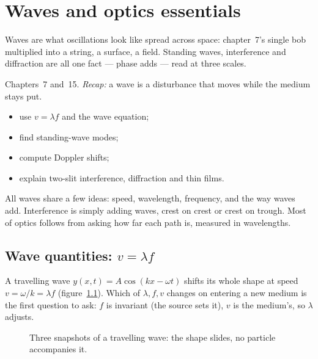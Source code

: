 \chapter{Waves and optics essentials}\label{ch:waves}

Waves are what oscillations look like spread across space: chapter~7's
single bob multiplied into a string, a surface, a field. Standing waves,
interference and diffraction are all one fact --- phase adds --- read at
three scales.

\begin{rulebox}
Chapters~7 and~15. \emph{Recap:} a wave is a disturbance that moves while the medium stays put.
\end{rulebox}
\begin{wins}
\begin{itemize}
\item use $v=\lambda f$ and the wave equation;
\item find standing-wave modes;
\item compute Doppler shifts;
\item explain two-slit interference, diffraction and thin films.
\end{itemize}
\end{wins}
\begin{principle}
All waves share a few ideas: speed, wavelength, frequency, and the way waves add. Interference is simply adding waves, crest on crest or crest on trough. Most of optics follows from asking how far each path is, measured in wavelengths.
\end{principle}

\section{Wave quantities: $v=\lambda f$}\label{sec:wav-quant}

A travelling wave $y(x,t)=A\cos(kx-\omega t)$ shifts its whole shape
at speed $v=\omega/k=\lambda f$ (figure~\ref{fig:trav}). Which of
$\lambda,f,v$ changes on entering a new medium is the first question to
ask: $f$ is invariant (the source sets it), $v$ is the medium's, so
$\lambda$ adjusts.

\begin{figure}[htbp]\centering

\caption{Three snapshots of a travelling wave: the shape slides, no
particle accompanies it.}
\label{fig:trav}
\end{figure}

